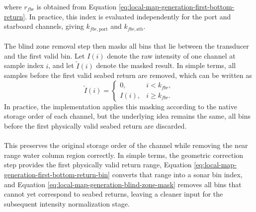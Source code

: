 where $r_{fbr}$ is obtained from Equation \ref{eq:local-map-generation-first-bottom-return}. In practice, this index is evaluated independently for the port and starboard channels, giving $k_{fbr,\mathrm{port}}$ and $k_{fbr,\mathrm{stb}}$.
\\ \\
The blind zone removal step then masks all bins that lie between the transducer and the first valid bin. Let $I(i)$ denote the raw intensity of one channel at sample index $i$, and let $\tilde{I}(i)$ denote the masked result. In simple terms, all samples before the first valid seabed return are removed, which can be written as
\begin{equation}
    \tilde{I}(i) =
    \begin{cases}
        0, & i < k_{fbr}, \\
        I(i), & i \geq k_{fbr}.
    \end{cases}
    \label{eq:local-map-generation-blind-zone-mask}
\end{equation}
In practice, the implementation applies this masking according to the native storage order of each channel, but the underlying idea remains the same, all bins before the first physically valid seabed return are discarded.
\\ \\
This preserves the original storage order of the channel while removing the near range water column region correctly. In simple terms, the geometric correction step provides the first physically valid return range, Equation \ref{eq:local-map-generation-first-bottom-return-bin} converts that range into a sonar bin index, and Equation \ref{eq:local-map-generation-blind-zone-mask} removes all bins that cannot yet correspond to seabed returns, leaving a cleaner input for the subsequent intensity normalization stage.



